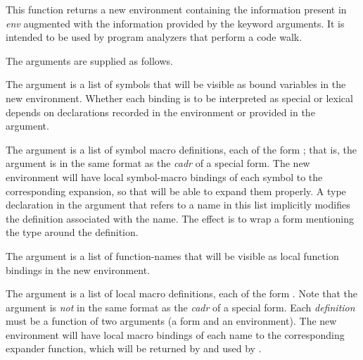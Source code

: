 \begin{newer}
\begin{defun}[Function]
  This function returns a new environment containing the information present in
  {\it env} augmented with the information provided by the keyword arguments.  It is
  intended to be used by program analyzers that perform a code walk.

  The arguments are supplied as follows.
\begin{flushdesc}
\item[\cd{:variable}]
     The argument is a list of symbols that will be visible as bound variables in
                the new environment.  Whether each binding is to be interpreted
                as special or lexical depends on  declarations recorded
                in the environment or provided in the  argument.

\item[\cd{:symbol-macro}]
 The argument is a list of symbol macro definitions, each of the form
                ; that is, the argument is
                in the same format as the
                {\it cadr} of a  special form.  The new environment
                will have local symbol-macro bindings of each symbol to the
                corresponding expansion, so that  will be able to
                expand them properly.  A type declaration in the 
                argument that refers to a name in this list implicitly
                modifies the definition associated with the name.  The effect
                is to wrap a  form mentioning the type around the
                definition.

\item[\cd{:function}]
     The argument is a list of function-names that will be visible as local
                function bindings in the new environment.

\item[\cd{:macro}]
        The argument is a list of local macro definitions, 
        each of the form .
        Note that the argument is {\it not}
                in the same format as the
                {\it cadr} of a  special form.
                Each {\it definition} must be a function of two
                arguments (a form and an environment).  The new environment
                will have local macro bindings of each name to the
                corresponding expander function, which will be returned by
                 and used by .


\end{flushdesc}
\end{defun}
\end{newer}

